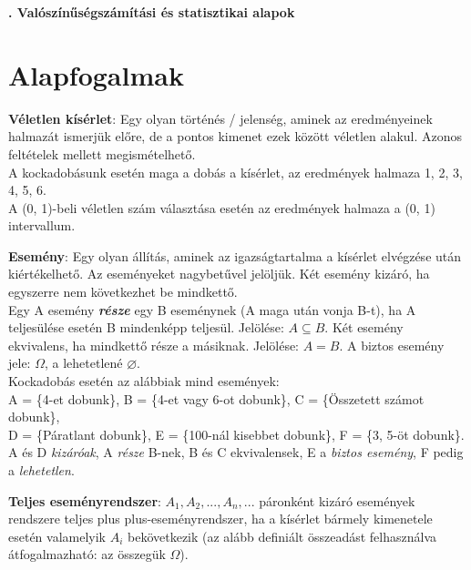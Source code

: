 \documentclass[tikz,12pt,margin=0px]{article}
\newcommand\lword[1]{\leavevmode\nobreak\hskip0pt plus\linewidth\penalty50\hskip0pt plus-\linewidth\nobreak #1}
\begin{document}
    \thispagestyle{fancy}

    \begin{center}
        {\Large\bfseries{}. Valószínűségszámítási és statisztikai alapok} \\
    \end{center}

    \section*{Alapfogalmak}

    \noindent \textbf{Véletlen kísérlet}: Egy olyan történés / jelenség, aminek az eredményeinek halmazát ismerjük előre, de a pontos kimenet ezek között véletlen alakul. Azonos feltételek mellett megismételhető.\\

    {\small
    \noindent A kockadobásunk esetén maga a dobás a kísérlet, az eredmények halmaza {1, 2, 3, 4, 5, 6}. \\
    A (0, 1)-beli véletlen szám választása esetén az eredmények halmaza a (0, 1) intervallum.\\
    }

    \noindent \textbf{Esemény}: Egy olyan állítás, aminek az igazságtartalma a kísérlet elvégzése után kiértékelhető. Az eseményeket nagybetűvel jelöljük. Két esemény kizáró, ha egyszerre nem következhet be mindkettő. \\

    \noindent Egy A esemény \textbf{\emph{része}} egy B eseménynek (A maga után vonja B-t), ha A teljesülése esetén B mindenképp teljesül. Jelölése: $A \subseteq B$. Két esemény ekvivalens, ha mindkettő része a másiknak. Jelölése: $A = B$.
    A biztos esemény jele: $\Omega$, a lehetetlené $\varnothing$.\\

    {\small
    \noindent Kockadobás esetén az alábbiak mind események:\\
    A = \{4-et dobunk\}, B = \{4-et vagy 6-ot dobunk\}, C = \{Összetett számot dobunk\},\\
    D = \{Páratlant dobunk\}, E = \{100-nál kisebbet dobunk\}, F = \{3, 5-öt dobunk\}.\\
    A és D \emph{kizáróak}, A \emph{része} B-nek, B és C ekvivalensek, E a \emph{biztos esemény}, F pedig a \emph{lehetetlen}.\\
    }

    \noindent \textbf{Teljes eseményrendszer}: $A_1, A_2, ..., A_n, ...$ páronként kizáró események rendszere teljes \lword{eseményrendszer}, ha a kísérlet bármely kimenetele esetén valamelyik $A_i$ bekövetkezik (az alább definiált összeadást felhasználva átfogalmazható: az összegük $\Omega$).\\
\end{document}
